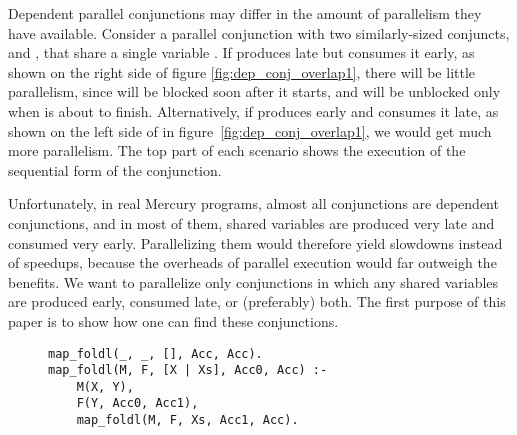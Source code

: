 Dependent parallel conjunctions may differ
in the amount of parallelism they have available.
Consider a parallel conjunction with two similarly-sized conjuncts,
 and , that share a single variable .
If  produces  late but  consumes it early,
as shown on the right side of figure \ref{fig:dep_conj_overlap1},
there will be little parallelism,
since  will be blocked soon after it starts,
and will be unblocked only when  is about to finish.
Alternatively, if  produces  early
and  consumes it late,
as shown on the left side of in figure~\ref{fig:dep_conj_overlap1},
we would get much more parallelism.
The top part of each scenario
shows the execution of the sequential form of the conjunction.

Unfortunately, in real Mercury programs,
almost all conjunctions are dependent conjunctions,
and in most of them,
shared variables are produced very late and consumed very early.
Parallelizing them would therefore yield slowdowns instead of speedups,
because the overheads of parallel execution would far outweigh the benefits.
We want to parallelize only conjunctions
in which any shared variables are produced early, consumed late,
or (preferably) both.
The first purpose of this paper is to show how one can find these conjunctions.

\begin{figure}[b]
\begin{verbatim}
map_foldl(_, _, [], Acc, Acc).
map_foldl(M, F, [X | Xs], Acc0, Acc) :-
    M(X, Y),
    F(Y, Acc0, Acc1),
    map_foldl(M, F, Xs, Acc1, Acc).
\end{verbatim}
\caption{\mapfoldl}
\label{fig:map_foldl}
\end{figure}

